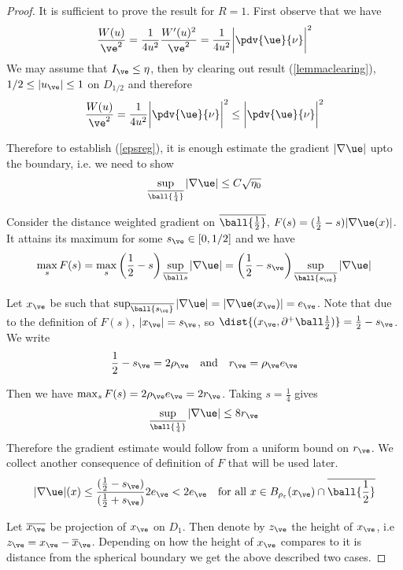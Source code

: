 \begin{proof}
It is sufficient to prove the result for $R=1$. First observe that we have 
$$\frac{W(u)}{\ve^2}=\frac{1}{4u^2}\frac{W'(u)^2}{\ve^2} = \frac{1}{4u^2}\bigg|\pdv{\ue}{\nu}\bigg|^2 $$
We may assume that $I_\ve \leq \eta$, then by clearing out result (\ref{lemmaclearing}), $1/2 \leq|u_\ve|\leq 1$ on $D_{1/2}$ and therefore
\begin{equation*}
    \frac{W(u)}{\ve^2}= \frac{1}{4u^2}\bigg|\pdv{\ue}{\nu}\bigg|^2  \leq \bigg|\pdv{\ue}{\nu}\bigg|^2
\end{equation*}

Therefore to establish (\ref{epsreg}), it is enough estimate the gradient $|\nabla \ue|$ upto the boundary, i.e. we need to show
\begin{equation} \label{gradest}
    \sup_{\overline{\ball {\frac{1}{4}}}} |\nabla \ue| \leq C\sqrt{\eta_0} 
\end{equation}

Consider the distance weighted gradient on $\overline{\ball {\frac{1}{2}}}$,  $F(s)=(\frac{1}{2}-s)|\nabla \ue(x)|$. It attains its maximum for some $s_{\ve} \in [0,1/2]$ and we have 
$$\max _{s} F(s) = \max_{s} \bigg(\frac{1}{2}-s \bigg) \sup_{\overline{\ball s}}|\nabla \ue| =\bigg(\frac{1}{2}-s_{\ve}\bigg) \sup_{\overline{\ball {s_{\ve}}}} |\nabla \ue| $$

Let $x_\ve$ be such that $\sup_{\overline{\ball {s_{\ve}}}} |\nabla \ue|=|\nabla \ue(x_\ve)| =e_\ve$. Note that due to the definition of $F(s)$, $|x_{\ve}|=s_{\ve}$, so $\dist{(x_\ve, \partial^+ \ball \frac{1}{2})}= \frac{1}{2}-s_\ve$. We write $$ \frac{1}{2}-s_\ve = 2\rho_\ve \quad \text{and} \quad r_\ve = \rho_\ve e_\ve$$

Then we have $\max_{s} F(s) =2\rho_\ve  e_\ve = 2r_\ve $. Taking $s=\frac{1}{4}$ gives
\begin{equation} \label{eqn:grad1}
    \sup_{\overline{\ball {\frac{1}{4}}}} |\nabla \ue| \leq 8 r_\ve
\end{equation}
Therefore the gradient estimate would follow from a uniform bound on $r_\ve$. We collect another consequence of definition of $F$ that will be used later.
\begin{equation} \label{eqn:gs}
    |\nabla \ue|(x) \leq \frac{(\frac{1}{2}-s_\ve)}{(\frac{1}{2}+s_\ve)}2 e_\ve < 2e_\ve \quad \text{for all } x \in B_{\rho_\varepsilon}(x_\ve) \cap \overline{\ball {\frac{1}{2}}} 
\end{equation}

Let $\overline{x_\ve}$ be projection of $x_\ve$ on $D_1$. Then denote by $z_\ve$ the height of $x_\ve$, i.e $z_\ve = x_\ve - \overline{x}_{\ve}$. Depending on how the height of $x_\ve$ compares to it is distance from the spherical boundary we get the above described two cases.



\end{proof}
